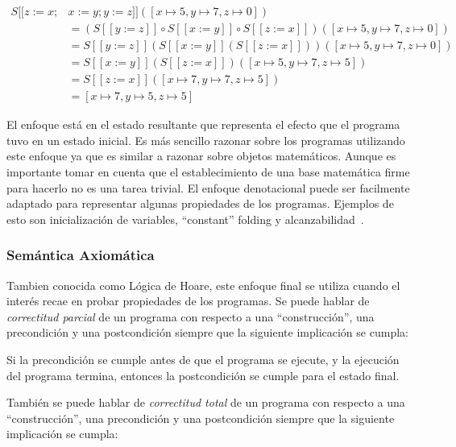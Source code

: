 \begin{align*}
S [\![ z:=x; & x:=y; y:=z ]\!]([x\mapsto5, y\mapsto7, z\mapsto0])\\
&= (S [\![ y:=z ]\!] \circ S [\![ x:=y ]\!] \circ S [\![ z:=x ]\!])([x\mapsto5, y\mapsto7, z\mapsto0])\\
&= S [\![ y:=z ]\!](S [\![ x:=y ]\!] (S [\![ z:=x ]\!]))([x\mapsto5, y\mapsto7, z\mapsto0])\\
&= S [\![ x:=y ]\!] (S [\![ z:=x ]\!])([x\mapsto5, y\mapsto7, z\mapsto5])\\
&= S [\![ z:=x ]\!]([x\mapsto7, y\mapsto7, z\mapsto5])\\
&= [x\mapsto7, y\mapsto5, z\mapsto5]
\end{align*}

El enfoque está en el estado resultante que representa el efecto que el programa tuvo en un estado inicial.
Es más sencillo razonar sobre los programas utilizando este enfoque ya que es similar a razonar sobre objetos matemáticos.
Aunque es importante tomar en cuenta que el establecimiento de una base matemática firme para hacerlo no es una tarea trivial.
El enfoque denotacional puede ser facilmente adaptado para representar algunas propiedades de los programas.
Ejemplos de esto son inicialización de variables, ``constant'' folding y alcanzabilidad~\cite{nielson}.


\subsubsection*{Semántica Axiomática}

\begin{comment}
FIXME construcción
\end{comment}
Tambien conocida como Lógica de Hoare, este enfoque final se utiliza cuando el interés recae en probar propiedades de los programas.
Se puede hablar de \textit{correctitud parcial} de un programa con respecto a una ``construcción'', una precondición y una postcondición siempre que la siguiente implicación se cumpla:

\begin{displayquote}
Si la precondición se cumple antes de que el programa se ejecute, y la ejecución del programa termina, entonces la postcondición se cumple para el estado final.
\end{displayquote}

También se puede hablar de \textit{correctitud total} de un programa con respecto a una ``construcción'', una precondición y una postcondición siempre que la siguiente implicación se cumpla:

